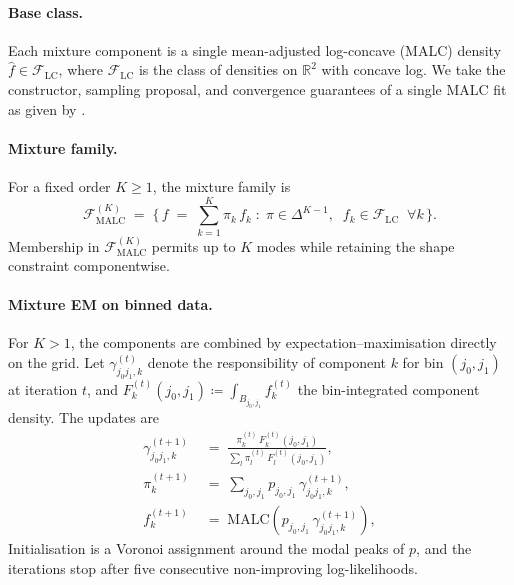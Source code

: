 \documentclass[11pt]{article}
\begin{document}
\paragraph{Base class.}
Each mixture component is a single mean-adjusted log-concave (MALC)
density $\hat{f} \in \mathcal{F}_{\mathrm{LC}}$, where
$\mathcal{F}_{\mathrm{LC}}$ is the class of densities on
$\mathbb{R}^{2}$ with concave log. We take the constructor, sampling
proposal, and convergence guarantees of a single MALC fit as given by
\citet{danisman2026malc}. 

\paragraph{Mixture family.}
For a fixed order $K \geq 1$, the mixture family is
\begin{equation}
  \mathcal{F}_{\mathrm{MALC}}^{(K)}
  \;=\;
  \Big\{\,
    f \;=\; \sum_{k=1}^{K} \pi_{k}\, f_{k}
    \;:\;
    \pi \in \Delta^{K-1},\;\;
    f_{k} \in \mathcal{F}_{\mathrm{LC}}\;\;\forall k
  \,\Big\}.
  \label{eq:malc-family}
\end{equation}
Membership in $\mathcal{F}_{\mathrm{MALC}}^{(K)}$ permits up to $K$
modes while retaining the shape constraint componentwise.

\paragraph{Mixture EM on binned data.}
For $K > 1$, the components are combined by
expectation--maximisation directly on the grid. Let
$\gamma_{j_{0} j_{1}, k}^{(t)}$ denote the responsibility of component
$k$ for bin $(j_{0}, j_{1})$ at iteration $t$, and
$F_{k}^{(t)}(j_{0}, j_{1}) \coloneqq \int_{B_{j_{0}, j_{1}}}
f_{k}^{(t)}$ the bin-integrated component density. The updates are
\begin{align}
  \gamma_{j_{0} j_{1}, k}^{(t+1)}
  \;&=\;
  \frac{\pi_{k}^{(t)}\, F_{k}^{(t)}(j_{0}, j_{1})}
       {\sum_{l} \pi_{l}^{(t)}\, F_{l}^{(t)}(j_{0}, j_{1})},
  \label{eq:malc-estep}
  \\[2pt]
  \pi_{k}^{(t+1)}
  \;&=\;
  \sum_{j_{0}, j_{1}} p_{j_{0}, j_{1}}\, \gamma_{j_{0} j_{1}, k}^{(t+1)},
  \label{eq:malc-pi-update}
  \\[2pt]
  f_{k}^{(t+1)}
  \;&=\;
  \mathrm{MALC}\!\left(
    p_{j_{0}, j_{1}}\, \gamma_{j_{0} j_{1}, k}^{(t+1)}
  \right),
  \label{eq:malc-mstep}
\end{align}
Initialisation is a Voronoi assignment around the modal peaks of $p$, and the iterations stop after five consecutive non-improving log-likelihoods.
\end{document}

